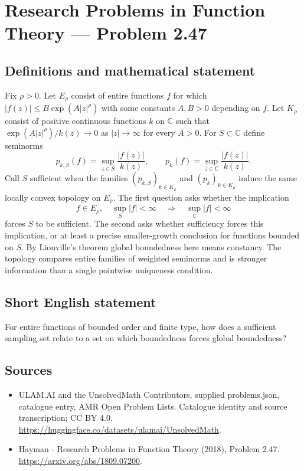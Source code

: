 \documentclass[11pt,a4paper]{article}
\begin{document}
\section*{Research Problems in Function Theory — Problem 2.47}\label{statement}

\subsection{Definitions and mathematical statement}
Fix $\rho>0$. Let $E_\rho$ consist of entire functions $f$ for which
$|f(z)|\le B\exp(A|z|^\rho)$ with some constants $A,B>0$ depending on $f$.
Let $K_\rho$ consist of positive continuous functions $k$ on $\mathbb C$ such that
$\exp(A|z|^\rho)/k(z)\to0$ as $|z|\to\infty$ for every $A>0$.
For $S\subset\mathbb C$ define seminorms
\[
p_{k,S}(f)=\sup_{z\in S}\frac{|f(z)|}{k(z)},\qquad
p_k(f)=\sup_{z\in\mathbb C}\frac{|f(z)|}{k(z)}.
\]
Call $S$ sufficient when the families $(p_{k,S})_{k\in K_\rho}$ and $(p_k)_{k\in K_\rho}$ induce the same locally convex topology on $E_\rho$.
The first question asks whether the implication
\[
f\in E_\rho,\quad\sup_S|f|<\infty
\quad\Longrightarrow\quad \sup_{\mathbb C}|f|<\infty
\]
forces $S$ to be sufficient. The second asks whether sufficiency forces this implication, or at least a precise smaller-growth conclusion for functions bounded on $S$. By Liouville's theorem global boundedness here means constancy. The topology compares entire families of weighted seminorms and is stronger information than a single pointwise uniqueness condition.
\subsection{Short English statement}
For entire functions of bounded order and finite type, how does a sufficient sampling set relate to a set on which boundedness forces global boundedness?
\subsection{Sources}
\begin{itemize}
\item[S1] ULAM.AI and the UnsolvedMath Contributors, supplied problems.json, catalogue entry, AMR Open Problem Lists. Catalogue identity and source transcription; CC BY 4.0.
\url{https://huggingface.co/datasets/ulamai/UnsolvedMath}.
\item[S2] Hayman - Research Problems in Function Theory (2018), Problem 2.47. 
\url{https://arxiv.org/abs/1809.07200}.
\end{itemize}
\end{document}

